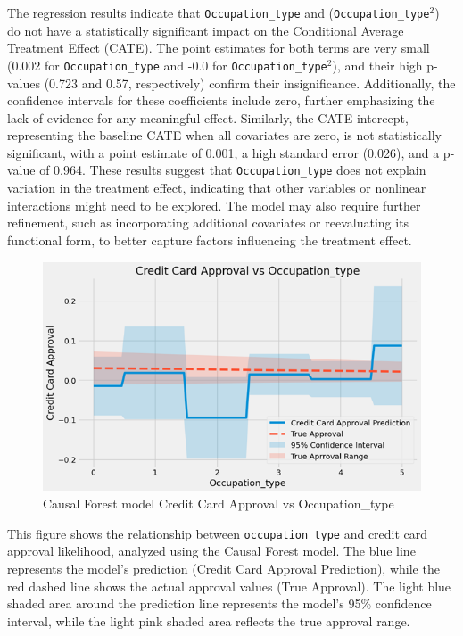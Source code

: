\documentclass[12pt]{report}
\begin{document}
    The regression results indicate that \texttt{Occupation\_type} and (\texttt{Occupation\_type}$^2$) do not have a statistically significant impact on the Conditional Average Treatment Effect (CATE). The point estimates for both terms are very small (0.002 for \texttt{Occupation\_type} and -0.0 for \texttt{Occupation\_type}$^2$), and their high p-values (0.723 and 0.57, respectively) confirm their insignificance. Additionally, the confidence intervals for these coefficients include zero, further emphasizing the lack of evidence for any meaningful effect. Similarly, the CATE intercept, representing the baseline CATE when all covariates are zero, is not statistically significant, with a point estimate of 0.001, a high standard error (0.026), and a p-value of 0.964. These results suggest that \texttt{Occupation\_type} does not explain variation in the treatment effect, indicating that other variables or nonlinear interactions might need to be explored. The model may also require further refinement, such as incorporating additional covariates or reevaluating its functional form, to better capture factors influencing the treatment effect.

    \begin{figure}[h!]
        \centering
        \includegraphics[width=\textwidth]{resources/pic/Causal Forest model Credit Card Approval vs Occupation_type.png}
        \caption{Causal Forest model Credit Card Approval vs Occupation\_type}
        \label{fig:Causal Forest model Credit Card Approval vs Occupation_type}
    \end{figure}

    This figure shows the relationship between \texttt{occupation\_type} and credit card approval likelihood, analyzed using the Causal Forest model. The blue line represents the model's prediction (Credit Card Approval Prediction), while the red dashed line shows the actual approval values (True Approval). The light blue shaded area around the prediction line represents the model's 95\% confidence interval, while the light pink shaded area reflects the true approval range.
\end{document}

